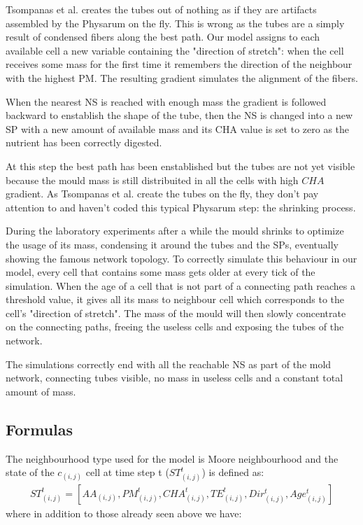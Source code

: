 \par
Tsompanas et al. \cite{Tsompanas2016} creates the tubes out of nothing as if they are artifacts assembled by the Physarum on the fly. This is wrong as the tubes are a simply result of condensed fibers along the best path. Our model assigns to each available cell a new variable containing the "direction of stretch": when the cell receives some mass for the first time it remembers the direction of the neighbour with the highest PM. The resulting gradient simulates the alignment of the fibers.

\par
When the nearest NS is reached with enough mass the gradient is followed backward to enstablish the shape of the tube, then the NS is changed into a new SP with a new amount of available mass and its CHA value is set to zero as the nutrient has been correctly digested.

\par
At this step the best path has been enstablished but the tubes are not yet visible because the mould mass is still distribuited in all the cells with high $CHA$ gradient.
As Tsompanas et al. \cite{Tsompanas2016} create the tubes on the fly, they don't pay attention to and haven't coded this typical Physarum step: the shrinking process.

\par
During the laboratory experiments after a while the mould shrinks to optimize the usage of its mass, condensing it around the tubes and the SPs, eventually showing the famous network topology.
To correctly simulate this behaviour in our model, every cell that contains some mass gets older at every tick of the simulation. When the age of a cell that is not part of a connecting path reaches a threshold value, it gives all its mass to neighbour cell which corresponds to the cell's "direction of stretch". The mass of the mould will then slowly concentrate on the connecting paths, freeing the useless cells and exposing the tubes of the network.

\par
The simulations correctly end with all the reachable NS as part of the mold network, connecting tubes visible, no mass in useless cells and a constant total amount of mass.

\subsection{Formulas}

The neighbourhood type used for the model is Moore neighbourhood and the state of the $c_{(i, j)}$ cell at time step t ($ ST^t_{(i, j)}$) is defined as:
\begin{align}
ST^t_{(i, j)} = [AA_{(i, j)}, PM^t_{(i, j)}, CHA^t_{(i, j)}, TE^t_{(i, j)}, Dir^t_{(i, j)}, Age^t_{(i, j)}]
\end{align}
where in addition to those already seen above we have:

